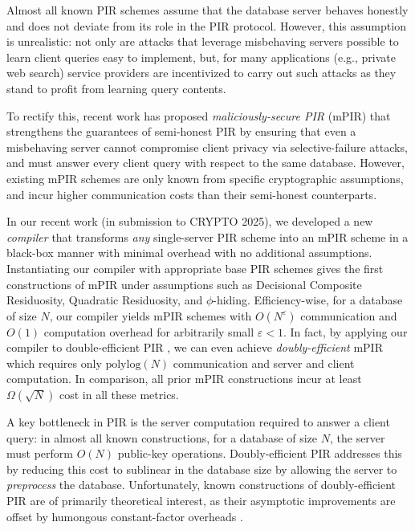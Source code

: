 \documentclass[11pt,letterpaper]{article}
\theoremstyle{definition} %
\theoremstyle{remark} %
\begin{document}
Almost all known PIR schemes assume that the database server behaves honestly and does not deviate from its role in the PIR protocol.
However, this assumption is unrealistic: 
not only are attacks that leverage misbehaving servers possible to learn client queries easy to implement, but, for many applications (e.g., private web search) service providers are incentivized to carry out such attacks as they stand to profit from learning query contents.

To rectify this, recent work has proposed \emph{maliciously-secure PIR} (mPIR) \cite{AuthenticatedPIR} that strengthens the guarantees of semi-honest PIR by ensuring that even a misbehaving server cannot compromise client privacy via selective-failure attacks, and must answer every client query with respect to the same database.
However, existing mPIR schemes are only known from specific cryptographic assumptions, and incur higher communication costs than their semi-honest counterparts.

In our recent work \cite{FalkMS24} (in submission to CRYPTO 2025), we developed a new \emph{compiler} that transforms \emph{any} single-server PIR scheme into an mPIR scheme in a black-box manner with minimal overhead with no additional assumptions.
Instantiating our compiler with appropriate base PIR schemes gives the first constructions of mPIR under assumptions such as Decisional Composite Residuosity, Quadratic Residuosity, and $\phi$-hiding.
Efficiency-wise, for a database of size $N$, our compiler yields mPIR schemes with $O(N^\varepsilon)$ communication and $O(1)$ computation overhead for arbitrarily small $\varepsilon < 1$.
In fact, by applying our compiler to double-efficient PIR \cite{LinMW23}, we can even achieve \emph{doubly-efficient} mPIR which requires only $\textrm{polylog}(N)$ communication and server and client computation. 
In comparison, all prior mPIR constructions incur at least $\Omega(\sqrt{N})$ cost in all these metrics.

A key bottleneck in PIR is the server computation required to answer a client query: in almost all known constructions, for a database of size $N$, the server must perform $O(N)$ public-key operations.
Doubly-efficient PIR \cite{constructions} addresses this by reducing this cost to sublinear in the database size by allowing the server to \emph{preprocess} the database.
Unfortunately, known constructions of doubly-efficient PIR are of primarily theoretical interest, as their asymptotic improvements are offset by humongous constant-factor overheads \cite{player}.
\end{document}
